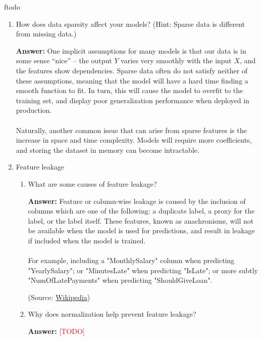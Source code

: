 ƒtodo\documentclass{article}
\newenvironment{QandA}{\begin{enumerate}[label=\arabic*.]}{\end{enumerate}}
\newenvironment{InnerQandA}{\begin{enumerate}[label=\roman*.]}{\end{enumerate}}
\newenvironment{answer}{\par\normalfont \textbf{Answer:}}{}
\newcommand{\todo}{\textcolor{red}{[TODO]}}
\begin{document}
\begin{QandA}
    \item How does data sparsity affect your models? (Hint: Sparse data is different from missing data.)
    \begin{answer}
        One implicit assumptions for many models is that our data is in some sense ``nice'' -- the output $Y$ varies very smoothly with the input $X$, and the features show dependencies. Sparse data often do not satisfy neither of these assumptions, meaning that the model will have a hard time finding a smooth function to fit. In turn, this will cause the model to overfit to the training set, and display poor generalization performance when deployed in production. \\\\
        Naturally, another common issue that can arise from  sparse features is the increase in space and time complexity. Models will require more coefficients, and storing the dataset in memory can become intractable. 
    \end{answer}

    \item Feature leakage
    \begin{InnerQandA}
        \item What are some causes of feature leakage?
        \begin{answer}
            Feature or column-wise leakage is caused by the inclusion of columns which are one of the following: a duplicate label, a proxy for the label, or the label itself. These features, known as anachronisms, will not be available when the model is used for predictions, and result in leakage if included when the model is trained. \\\\
            For example, including a "MonthlySalary" column when predicting "YearlySalary"; or "MinutesLate" when predicting "IsLate"; or more subtly "NumOfLatePayments" when predicting "ShouldGiveLoan".

            (Source: \href{https://en.wikipedia.org/wiki/Leakage_(machine_learning)}{Wikipedia})
        \end{answer}

        \item Why does normalization help prevent feature leakage?
        \begin{answer}
            \todo 
        \end{answer}


\end{InnerQandA}
\end{QandA}
\end{document}
